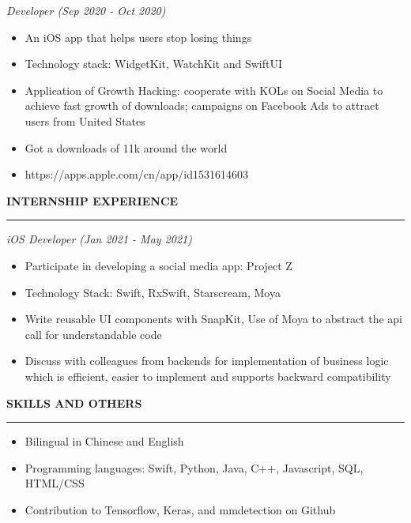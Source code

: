 \documentclass{article}
\begin{document}
\emph{Developer (Sep 2020 - Oct 2020)}
\begin{itemize}[leftmargin=*]
\item An iOS app that helps users stop losing things
\item Technology stack: WidgetKit, WatchKit and SwiftUI
\item Application of Growth Hacking: cooperate with KOLs on Social Media to achieve fast growth of downloads; campaigns on Facebook Ads to attract users from United States
\item Got a downloads of 11k around the world
\item https://apps.apple.com/cn/app/id1531614603

\end{itemize}
\noindent
{\textbf{INTERNSHIP EXPERIENCE}}\newline
\rule{\textwidth}{1pt}\newline
\emph{iOS Developer (Jan 2021 - May 2021)}
\begin{itemize}[leftmargin=*]
\item Participate in developing a social media app: Project Z
\item Technology Stack: Swift, RxSwift, Starscream, Moya
\item Write reusable UI components with SnapKit, Use of Moya to abstract the api call for understandable code
\item Discuss with colleagues from backends for implementation of business logic which is efficient, easier to implement and supports backward compatibility

\end{itemize}
\noindent
{\textbf{SKILLS AND OTHERS}}\newline
\rule{\textwidth}{1pt}\newline\begin{itemize}[leftmargin=*]
\item Bilingual in Chinese and English
\item Programming languages: Swift, Python, Java, C++, Javascript, SQL, HTML/CSS
\item Contribution to Tensorflow, Keras, and mmdetection on Github

\end{itemize}
\end{document}
